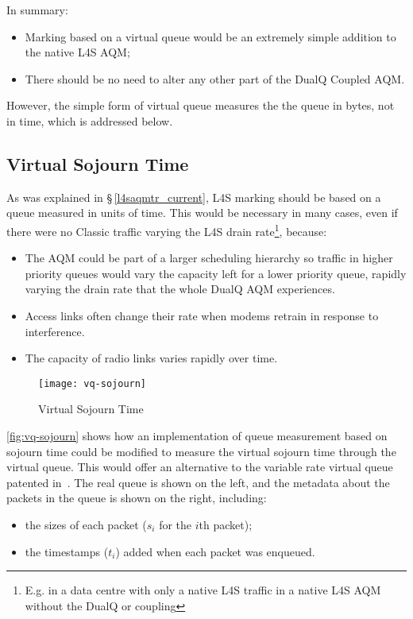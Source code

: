 In summary:
\begin{itemize}
	\item Marking based on a virtual queue would be an extremely simple addition to the native L4S AQM;
	\item There should be no need to alter any other part of the DualQ Coupled AQM.
\end{itemize}

However, the simple form of virtual queue measures the the queue in bytes, not in time, which is addressed below.

\subsection{Virtual Sojourn Time}\label{l4saqmtr_vq-sojourn}

As was explained in \S\,\ref{l4saqmtr_current}, L4S marking should be based on a queue measured in units of time. This would be necessary in many cases, even if there were no Classic traffic varying the L4S drain rate\footnote{E.g. in a data centre with only a native L4S traffic in a native L4S AQM without the DualQ or coupling}, because:
\begin{itemize}
	\item The AQM could be part of a larger scheduling hierarchy so traffic in higher priority queues would vary the capacity left for a lower priority queue, rapidly varying the drain rate that the whole DualQ AQM experiences.
	\item Access links often change their rate when modems retrain in response to interference. 
	\item The capacity of radio links varies rapidly over time.
\end{itemize}

\begin{figure}[h]
	\centering
	\texttt{[image: vq-sojourn]}
	\caption{Virtual Sojourn Time}\label{fig:vq-sojourn}
\end{figure}

\autoref{fig:vq-sojourn} shows how an implementation of queue measurement based on sojourn time could be modified to measure the virtual sojourn time through the virtual queue. This would offer an alternative to the variable rate virtual queue patented in~\cite{Eardley14:vary_vq_patent}. The real queue is shown on the left, and the metadata about the packets in the queue is shown on the right, including:
\begin{itemize}
	\item the sizes of each packet (\(s_i\) for the \(i\)th packet);
	\item the timestamps (\(t_i\)) added when each packet was enqueued.
\end{itemize}

